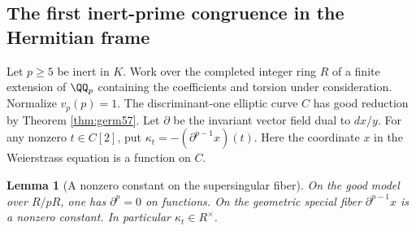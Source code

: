 \documentclass[a4paper,11pt]{article}
\newtheorem{lemma}[proposition]{Lemma}
\theoremstyle{definition}
\theoremstyle{remark}
\numberwithin{equation}{section}
\begin{document}
\subsection{The first inert-prime congruence in the Hermitian frame}\label{nav:V-23}
Let \(p\ge5\) be inert in \(K\). Work over the completed integer
ring \(R\) of a finite extension of \(\QQ_p\) containing the
coefficients and torsion under consideration. Normalize \(v_p(p)=1\).
The discriminant-one elliptic curve \(C\) has good reduction by
Theorem \ref{thm:germ57}.
Let \(\partial\) be the invariant vector field dual to \(dx/y\).
For any nonzero \(t\in C[2]\), put
\(\kappa_t=-(\partial^{p-1}x)(t)\). Here the coordinate \(x\)
in the Weierstrass equation is a function on \(C\).

\begin{lemma}[A nonzero constant on the supersingular fiber]\label{lem:kappa62}
On the good model over \(R/pR\), one has \(\partial^p=0\) on
functions. On the geometric special fiber \(\partial^{p-1}x\)
is a nonzero constant. In particular \(\kappa_t\in R^\times\).
\end{lemma}
\end{document}
